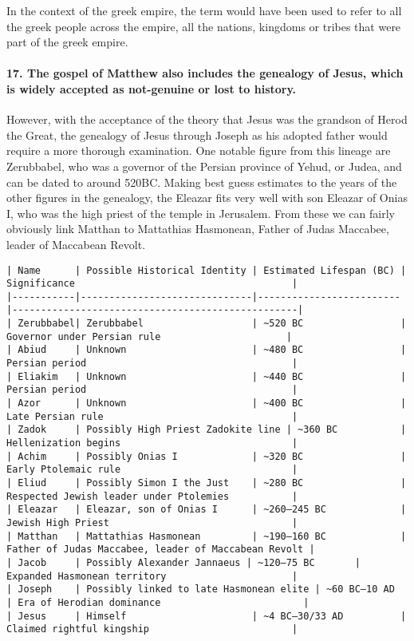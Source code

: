 In the context of the greek empire, the term would have been used to refer to all the greek people across the empire, all the nations, kingdoms or tribes that were part of the greek empire.

\paragraph{17.
The gospel of Matthew also includes the genealogy of Jesus, which is widely accepted as not-genuine or lost to history.}\label{par:the-gospel-of-matthew-also-includes-the-genealogy-of-jesus-which-is-widely-accepted-as-not-genuine-or-lost-to-history.}

However, with the acceptance of the theory that Jesus was the grandson of Herod the Great, the genealogy of Jesus through Joseph as his adopted father would require a more thorough examination.
One notable figure from this lineage are Zerubbabel, who was a governor of the Persian province of Yehud, or Judea, and can be dated to around 520BC.
Making best guess estimates to the years of the other figures in the genealogy, the Eleazar fits very well with son Eleazar of Onias I, who was the high priest of the temple in Jerusalem.
From these we can fairly obviously link Matthan to Mattathias Hasmonean, Father of Judas Maccabee, leader of Maccabean Revolt.

\begin{verbatim}
| Name      | Possible Historical Identity | Estimated Lifespan (BC) | Significance                                      |
|-----------|------------------------------|-------------------------|--------------------------------------------------|
| Zerubbabel| Zerubbabel                   | ~520 BC                 | Governor under Persian rule                      |
| Abiud     | Unknown                      | ~480 BC                 | Persian period                                    |
| Eliakim   | Unknown                      | ~440 BC                 | Persian period                                    |
| Azor      | Unknown                      | ~400 BC                 | Late Persian rule                                 |
| Zadok     | Possibly High Priest Zadokite line | ~360 BC           | Hellenization begins                              |
| Achim     | Possibly Onias I             | ~320 BC                 | Early Ptolemaic rule                              |
| Eliud     | Possibly Simon I the Just    | ~280 BC                 | Respected Jewish leader under Ptolemies           |
| Eleazar   | Eleazar, son of Onias I      | ~260–245 BC             | Jewish High Priest                                |
| Matthan   | Mattathias Hasmonean         | ~190–160 BC             | Father of Judas Maccabee, leader of Maccabean Revolt |
| Jacob     | Possibly Alexander Jannaeus | ~120–75 BC       | Expanded Hasmonean territory                      |
| Joseph    | Possibly linked to late Hasmonean elite | ~60 BC–10 AD  | Era of Herodian dominance                         |
| Jesus     | Himself                      | ~4 BC–30/33 AD          | Claimed rightful kingship                         |
\end{verbatim}


